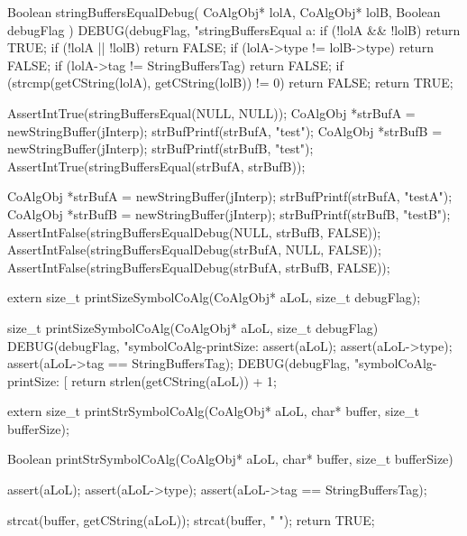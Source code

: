 \startCCode
Boolean stringBuffersEqualDebug(
  CoAlgObj* lolA,
  CoAlgObj* lolB,
  Boolean debugFlag
) {
  DEBUG(debugFlag, "stringBuffersEqual a:%
  if (!lolA && !lolB) return TRUE;
  if (!lolA || !lolB) return FALSE;
  if (lolA->type != lolB->type) return FALSE;
  if (lolA->tag != StringBuffersTag) return FALSE;
  if (strcmp(getCString(lolA), getCString(lolB)) != 0) return FALSE;
  return TRUE;
}
\stopCCode


\startCTest
  AssertIntTrue(stringBuffersEqual(NULL, NULL));
  CoAlgObj *strBufA = newStringBuffer(jInterp);
  strBufPrintf(strBufA, "test");
  CoAlgObj *strBufB = newStringBuffer(jInterp);
  strBufPrintf(strBufB, "test");
  AssertIntTrue(stringBuffersEqual(strBufA, strBufB));
\stopCTest
\stopTestCase


\startCTest
  CoAlgObj *strBufA = newStringBuffer(jInterp);
  strBufPrintf(strBufA, "testA");
  CoAlgObj *strBufB = newStringBuffer(jInterp);
  strBufPrintf(strBufB, "testB");
  AssertIntFalse(stringBuffersEqualDebug(NULL, strBufB, FALSE));
  AssertIntFalse(stringBuffersEqualDebug(strBufA, NULL, FALSE));
  AssertIntFalse(stringBuffersEqualDebug(strBufA, strBufB, FALSE));
\stopCTest
\stopTestCase
\stopTestSuite


\startCHeader
extern size_t printSizeSymbolCoAlg(CoAlgObj* aLoL, size_t debugFlag);
\stopCHeader

\startCCode
size_t printSizeSymbolCoAlg(CoAlgObj* aLoL, size_t debugFlag) {
  DEBUG(debugFlag, "symbolCoAlg-printSize: %
  assert(aLoL);
  assert(aLoL->type);
  assert(aLoL->tag == StringBuffersTag);
  DEBUG(debugFlag, "symbolCoAlg-printSize: [%
  return strlen(getCString(aLoL)) + 1;
}
\stopCCode

\startCHeader
extern size_t printStrSymbolCoAlg(CoAlgObj* aLoL,
                                  char* buffer, size_t bufferSize);
\stopCHeader

\startCCode
Boolean printStrSymbolCoAlg(CoAlgObj* aLoL,
                           char* buffer, size_t bufferSize) {
  assert(aLoL);
  assert(aLoL->type);
  assert(aLoL->tag == StringBuffersTag);

  strcat(buffer, getCString(aLoL));
  strcat(buffer, " ");
  return TRUE;
}
\stopCCode

